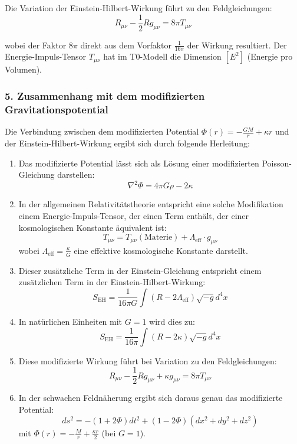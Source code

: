 \documentclass[12pt,a4paper]{article}
\begin{document}
	Die Variation der Einstein-Hilbert-Wirkung führt zu den Feldgleichungen:
	\[
	R_{\mu\nu} - \frac{1}{2}Rg_{\mu\nu} = 8\pi T_{\mu\nu}
	\]
	
	wobei der Faktor $8\pi$ direkt aus dem Vorfaktor $\frac{1}{16\pi}$ der Wirkung resultiert. Der Energie-Impuls-Tensor $T_{\mu\nu}$ hat im T0-Modell die Dimension $[E^2]$ (Energie pro Volumen).
	
	\subsubsection*{5. Zusammenhang mit dem modifizierten Gravitationspotential}
	
	Die Verbindung zwischen dem modifizierten Potential $\Phi(r) = -\frac{GM}{r} + \kappa r$ und der Einstein-Hilbert-Wirkung ergibt sich durch folgende Herleitung:
	
	\begin{enumerate}
		\item Das modifizierte Potential lässt sich als Lösung einer modifizierten Poisson-Gleichung darstellen:
		\[
		\nabla^2\Phi = 4\pi G\rho - 2\kappa
		\]
		
		\item In der allgemeinen Relativitätstheorie entspricht eine solche Modifikation einem Energie-Impuls-Tensor, der einen Term enthält, der einer kosmologischen Konstante äquivalent ist:
		\[
		T_{\mu\nu} = T_{\mu\nu}(\text{Materie}) + \Lambda_{\text{eff}} \cdot g_{\mu\nu}
		\]
		wobei $\Lambda_{\text{eff}} = \frac{\kappa}{G}$ eine effektive kosmologische Konstante darstellt.
		
		\item Dieser zusätzliche Term in der Einstein-Gleichung entspricht einem zusätzlichen Term in der Einstein-Hilbert-Wirkung:
		\[
		S_{\mathrm{EH}} = \frac{1}{16\pi G}\int(R - 2\Lambda_{\text{eff}})\sqrt{-g}d^4x
		\]
		
		\item In natürlichen Einheiten mit $G = 1$ wird dies zu:
		\[
		S_{\mathrm{EH}} = \frac{1}{16\pi}\int(R - 2\kappa)\sqrt{-g}d^4x
		\]
		
		\item Diese modifizierte Wirkung führt bei Variation zu den Feldgleichungen:
		\[
		R_{\mu\nu} - \frac{1}{2}Rg_{\mu\nu} + \kappa g_{\mu\nu} = 8\pi T_{\mu\nu}
		\]
		
		\item In der schwachen Feldnäherung ergibt sich daraus genau das modifizierte Potential:
		\[
		ds^2 = -(1+2\Phi)dt^2 + (1-2\Phi)(dx^2 + dy^2 + dz^2)
		\]
		mit $\Phi(r) = -\frac{M}{r} + \frac{\kappa r}{2}$ (bei $G = 1$).
	\end{enumerate}
\end{document}
